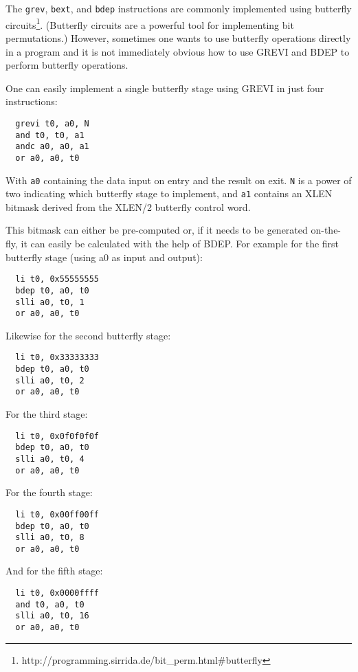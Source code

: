 The \texttt{grev}, \texttt{bext}, and \texttt{bdep} instructions are commonly
implemented using butterfly circuits\footnote{http://programming.sirrida.de/bit\_perm.html\#butterfly}.
(Butterfly circuits are a powerful tool for implementing bit permutations.)
However, sometimes one wants to use butterfly operations directly in a program
and it is not immediately obvious how to use GREVI and BDEP to perform
butterfly operations.

One can easily implement a single butterfly stage using GREVI in just four
instructions:

\begin{verbatim}
  grevi t0, a0, N
  and t0, t0, a1
  andc a0, a0, a1
  or a0, a0, t0
\end{verbatim}

With {\tt a0} containing the data input on entry and the result on exit. {\tt N} is a
power of two indicating which butterfly stage to implement, and {\tt a1} contains
an XLEN bitmask derived from the XLEN/2 butterfly control word.

This bitmask can either be pre-computed or, if it needs to be generated
on-the-fly, it can easily be calculated with the help of BDEP. For example
for the first butterfly stage (using a0 as input and output):

\begin{verbatim}
  li t0, 0x55555555
  bdep t0, a0, t0
  slli a0, t0, 1
  or a0, a0, t0
\end{verbatim}

Likewise for the second butterfly stage:

\begin{verbatim}
  li t0, 0x33333333
  bdep t0, a0, t0
  slli a0, t0, 2
  or a0, a0, t0
\end{verbatim}

For the third stage:

\begin{verbatim}
  li t0, 0x0f0f0f0f
  bdep t0, a0, t0
  slli a0, t0, 4
  or a0, a0, t0
\end{verbatim}

For the fourth stage:

\begin{verbatim}
  li t0, 0x00ff00ff
  bdep t0, a0, t0
  slli a0, t0, 8
  or a0, a0, t0
\end{verbatim}

And for the fifth stage:

\begin{verbatim}
  li t0, 0x0000ffff
  and t0, a0, t0
  slli a0, t0, 16
  or a0, a0, t0
\end{verbatim}
